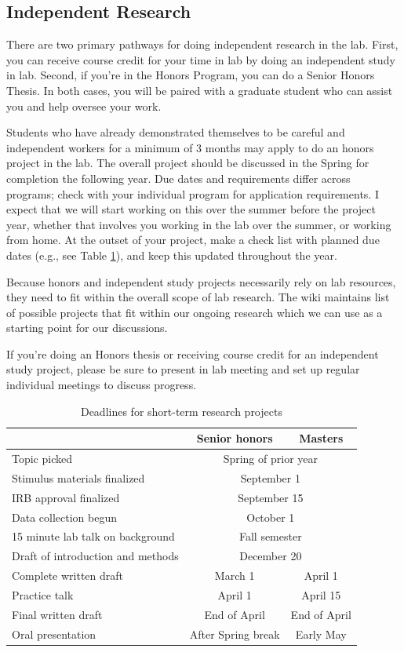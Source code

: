 \documentclass[letterpaper,12pt,oneside]{memoir}
\begin{document}
\subsection{Independent Research}
There are two primary pathways for doing independent research in the lab. First, you can receive course credit for your time in lab by doing an independent study in lab. Second, if you're in the Honors Program, you can do a Senior Honors Thesis. In both cases, you will be paired with a graduate student who can assist you and help oversee your work. 

Students who have already demonstrated themselves to be careful and independent workers for a minimum of 3 months may apply to do an honors project in the lab. The overall project should be discussed in the Spring for completion the following year. Due dates and requirements differ across programs; check with your individual program for application requirements. I expect that we will start working on this over the summer before the project year, whether that involves you working in the lab over the summer, or working from home. At the outset of your project, make a check list with planned due dates (e.g., see Table \ref{table:deadlines}), and keep this updated throughout the year.

Because honors and independent study projects necessarily rely on lab resources, they need to fit within the overall scope of lab research. The wiki maintains list of possible  projects that fit within our ongoing research which we can use as a starting point for our discussions.

If you're doing an Honors thesis or receiving course credit for an independent study project, please be sure to present in lab meeting and set up regular individual meetings to discuss progress. 

\begin{table}
\centering
\caption{Deadlines for short-term research projects}
\begin{tabular}{lcc}
\toprule
& Senior honors & Masters\\
\midrule
Topic picked& \multicolumn{2}{c}{Spring of prior year}\\
Stimulus materials finalized& \multicolumn{2}{c}{September 1}\\
IRB approval finalized& \multicolumn{2}{c}{September 15}\\
Data collection begun& \multicolumn{2}{c}{October 1}\\
15 minute lab talk on background& \multicolumn{2}{c}{Fall semester}\\
Draft of introduction and methods& \multicolumn{2}{c}{December 20}\\
Complete written draft& March 1& April 1\\
Practice talk& April 1 & April 15\\
Final written draft& End of April & End of April\\
Oral presentation& After Spring break & Early May\\
\bottomrule
\end{tabular}
\label{table:deadlines}
\end{table}
\end{document}
